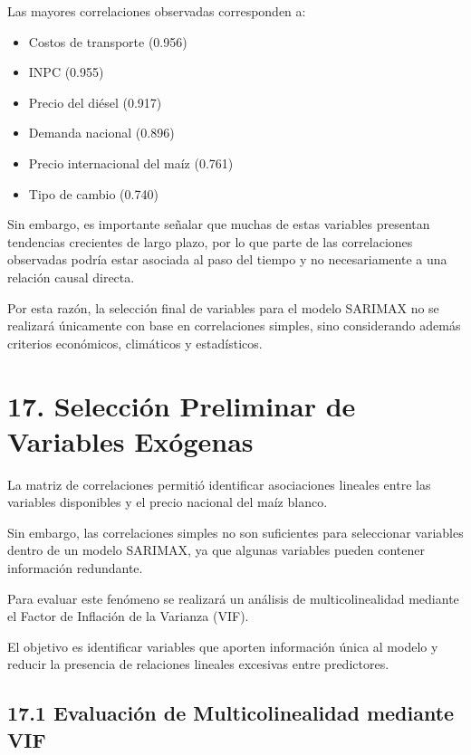 \documentclass[11pt]{article}
\providecommand{\tightlist}{%
      \setlength{\itemsep}{0pt}\setlength{\parskip}{0pt}}
\begin{document}
Las mayores correlaciones observadas corresponden a:

\begin{itemize}
\tightlist
\item
  Costos de transporte (0.956)
\item
  INPC (0.955)
\item
  Precio del diésel (0.917)
\item
  Demanda nacional (0.896)
\item
  Precio internacional del maíz (0.761)
\item
  Tipo de cambio (0.740)
\end{itemize}

Sin embargo, es importante señalar que muchas de estas variables
presentan tendencias crecientes de largo plazo, por lo que parte de las
correlaciones observadas podría estar asociada al paso del tiempo y no
necesariamente a una relación causal directa.

Por esta razón, la selección final de variables para el modelo SARIMAX
no se realizará únicamente con base en correlaciones simples, sino
considerando además criterios económicos, climáticos y estadísticos.

    \hypertarget{selecciuxf3n-preliminar-de-variables-exuxf3genas}{%
\section{17. Selección Preliminar de Variables
Exógenas}\label{selecciuxf3n-preliminar-de-variables-exuxf3genas}}

La matriz de correlaciones permitió identificar asociaciones lineales
entre las variables disponibles y el precio nacional del maíz blanco.

Sin embargo, las correlaciones simples no son suficientes para
seleccionar variables dentro de un modelo SARIMAX, ya que algunas
variables pueden contener información redundante.

Para evaluar este fenómeno se realizará un análisis de multicolinealidad
mediante el Factor de Inflación de la Varianza (VIF).

El objetivo es identificar variables que aporten información única al
modelo y reducir la presencia de relaciones lineales excesivas entre
predictores.

    \hypertarget{evaluaciuxf3n-de-multicolinealidad-mediante-vif}{%
\subsection{17.1 Evaluación de Multicolinealidad mediante
VIF}\label{evaluaciuxf3n-de-multicolinealidad-mediante-vif}}
\end{document}

